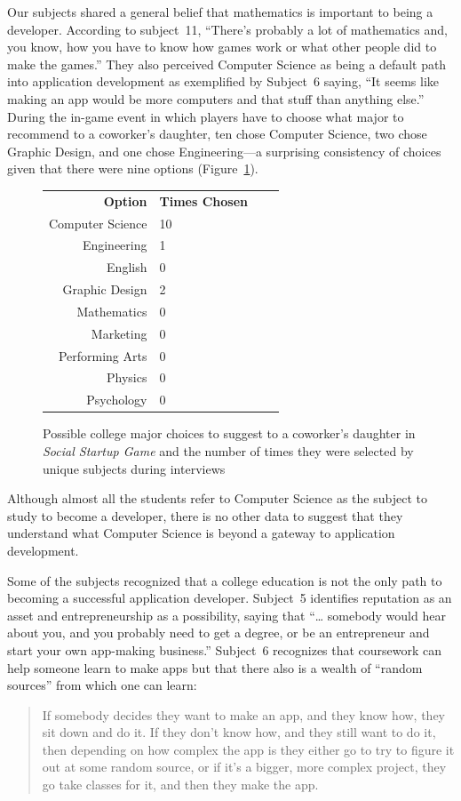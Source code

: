 \documentclass[letterpaper]{article}
\begin{document}
Our subjects shared a general belief that mathematics is important
to being a developer. According to subject~11, 
``There's probably a lot of mathematics and, you know, how you have to
know how games work or what other people did to make the games.''
% 
They also perceived Computer Science as being a default path into
application development as exemplified by Subject~6 saying, 
``It seems like making an
app would be more computers and that stuff than anything else.''
During the in-game event in which players have to choose what major to recommend
to a coworker's daughter, ten chose Computer Science, two chose 
Graphic Design, and one chose Engineering---a surprising consistency
of choices given that there were nine options (Figure~\ref{fig:child-advice}).
%
\begin{figure}
\begin{framed}
\centering
\begin{tabular}{rlrl}
\textbf{Option} & \textbf{Times Chosen}\\
Computer Science & 10\\
Engineering & 1\\
English & 0\\
Graphic Design & 2\\
Mathematics & 0\\
Marketing & 0\\
Performing Arts & 0\\
Physics & 0\\
Psychology & 0
\end{tabular}
\caption{Possible college major choices to suggest to a coworker's daughter 
 in \textit{Social Startup Game} and the number of times they were
 selected by unique subjects during interviews}
\label{fig:child-advice}
\end{framed}
\end{figure}
%
Although almost all the students refer to Computer Science as the
subject to study to become a developer, there is no other data
to suggest that they understand what Computer Science is beyond a gateway
to application development.

Some of the subjects recognized that a college education is not the only
path to becoming a successful application developer.
Subject~5 identifies reputation as an asset and entrepreneurship as a 
possibility, saying that ``\ldots{} somebody would hear about you, and you probably need to get a degree, or be an entrepreneur and start your own app-making business.''
Subject~6 recognizes that coursework can help someone learn to make apps
but that there also is a wealth of ``random sources'' from which one can learn:
\begin{quote}
If somebody decides they want to make 
an app, and they know how, they sit down and do it. If they don't know how,
and they still want to do it, then depending on how complex the app is they 
either go to try to figure it out at some random source, or if it's a bigger,
more complex project, they go take classes for it, and then they make the app.
\end{quote}
\end{document}
